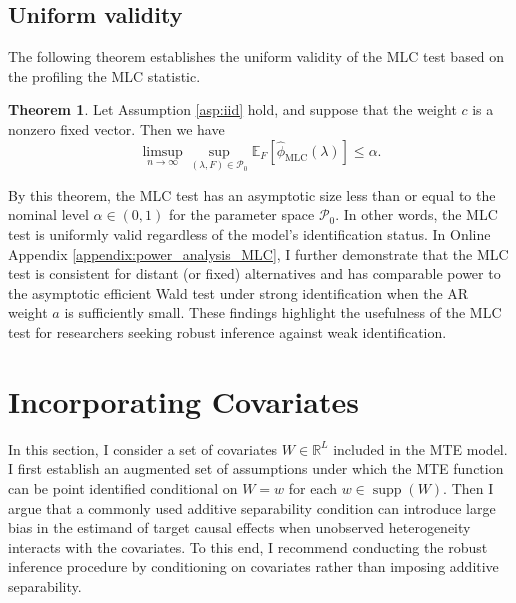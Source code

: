 \documentclass[11pt]{article}
\theoremstyle{definition}
\newtheorem{theorem}{Theorem}[section]
\DeclareMathOperator*{\supp}{supp}
\newcommand{\R}{\ensuremath{\mathbb{R}}}
\newcommand{\Exp}{\ensuremath{\mathbb{E}}} %
\newcommand{\0}{\ensuremath{\mathbf{0}}}
\begin{document}
\begin{bibunit}
\subsection{Uniform validity}
\label{sec:unifom_size}
The following theorem establishes the uniform validity of the MLC test based on the profiling the MLC statistic.
\begin{theorem}
\label{thm:uniform_validity}
Let Assumption \ref{asp:iid} hold, and suppose that the weight $c$ is a nonzero fixed vector. Then we have
\[
	\limsup_{n\to\infty}\sup_{(\lambda,F)\in\mathcal{P}_0} \Exp_F[\hat{\phi}_{\text{MLC}}(\lambda)] \leq \alpha.
\]
\end{theorem}

By this theorem, the MLC test has an asymptotic size less than or equal to the nominal level $\alpha \in (0,1)$ for the parameter space $\mathcal{P}_0$. In other words, the MLC test is uniformly valid regardless of the model's identification status. In Online Appendix \ref{appendix:power_analysis_MLC}, I further demonstrate that the MLC test is consistent for distant (or fixed) alternatives and has comparable power to the asymptotic efficient Wald test under strong identification when the AR weight $a$ is sufficiently small. These findings highlight the usefulness of the MLC test for researchers seeking robust inference against weak identification.

\section{Incorporating Covariates}
\label{sec:covariates}
%

In this section, I consider a set of covariates $W \in \R^L$ included in the MTE model. I first establish an augmented set of assumptions under which the MTE function can be point identified conditional on $W=w$ for each $w \in \supp(W)$. Then I argue that a commonly used additive separability condition can introduce large bias in the estimand of target causal effects when unobserved heterogeneity interacts with the covariates. To this end, I recommend conducting the robust inference procedure by conditioning on covariates rather than imposing additive separability.


\end{bibunit}
\end{document}
